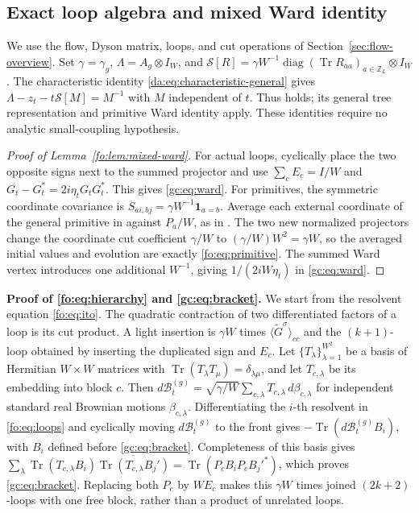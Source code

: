 \documentclass[11pt]{article}
\numberwithin{equation}{section}
\theoremstyle{remark}
\newcommand{\Z}{\mathbb Z}
\newcommand{\Tr}{\operatorname{Tr}}
\newcommand{\wt}{\widetilde}
\newcommand{\diag}{\operatorname{diag}}
\begin{document}
\subsection{Exact loop algebra and mixed Ward identity}\label{sec:gc-objects}
We use the flow, Dyson matrix, loops, and cut operations of
Section~\ref{sec:flow-overview}. Set $\gamma=\gamma_g$,
$\Lambda=A_g\otimes I_W$, and
$\mathcal S[R]=\gamma W^{-1}\diag(\Tr R_{aa})_{a\in\Z_L}\otimes I_W$.
The characteristic identity \eqref{da:eq:characteristic-general} gives
$\Lambda-z_t-t\mathcal S[M]=M^{-1}$ with $M$ independent of $t$.
Thus \cite[Assumption~4.1]{TYY} holds; its general tree representation
\cite[Lemma~4.16, (4.15)--(4.16)]{TYY} and primitive Ward identity
\cite[Corollary~4.21]{TYY} apply. These identities require no analytic
small-coupling hypothesis.

\begin{proof}[Proof of Lemma~\ref{fo:lem:mixed-ward}]
For actual loops, cyclically place the two opposite signs next to the
summed projector and use $\sum_cE_c=I/W$ and
$G_t-G_t^*=2i\eta_tG_tG_t^*$. This gives \eqref{gc:eq:ward}.
For primitives, the symmetric coordinate covariance is
$S_{ai,bj}=\gamma W^{-1}\mathbf1_{a=b}$.
Average each external coordinate of the general primitive in
\cite[Corollary~4.21]{TYY} against $P_a/W$, as in
\cite[Lemma~4.26, (4.38)]{TYY}.
The two new normalized projectors change the coordinate cut coefficient
$\gamma/W$ to $(\gamma/W)W^2=\gamma W$, so the averaged initial
values and evolution are exactly \eqref{fo:eq:primitive}.
The summed Ward vertex introduces one additional $W^{-1}$, giving
$1/(2iW\eta_t)$ in \eqref{gc:eq:ward}.
\end{proof}

\noindent\textbf{Proof of \eqref{fo:eq:hierarchy} and \eqref{gc:eq:bracket}.}
We start from the resolvent equation \eqref{fo:eq:ito}. The quadratic
contraction of two differentiated factors of a loop is its cut product.
A light insertion is $\gamma W$ times
$\langle\wt G^{\sigma}\rangle_{cc}$ and the $(k+1)$-loop obtained by
inserting the duplicated sign and $E_c$.
Let $\{T_\lambda\}_{\lambda=1}^{W^2}$ be a basis of Hermitian
$W\times W$ matrices with $\Tr(T_\lambda T_\mu)=\delta_{\lambda\mu}$,
and let $T_{c,\lambda}$ be its embedding into block $c$.
Then $d\mathcal B_t^{(g)}=\sqrt{\gamma/W}\sum_{c,\lambda}
T_{c,\lambda}\,d\beta_{c,\lambda}$ for independent standard real
Brownian motions $\beta_{c,\lambda}$.
Differentiating the $i$-th resolvent in \eqref{fo:eq:loops} and
cyclically moving $d\mathcal B_t^{(g)}$ to the front gives
$-\Tr(d\mathcal B_t^{(g)}B_i)$, with $B_i$ defined before
\eqref{gc:eq:bracket}.
Completeness of this basis gives
$\sum_\lambda\Tr(T_{c,\lambda}B_i)
\overline{\Tr(T_{c,\lambda}B_j')}
=\Tr(P_cB_iP_cB_j'^*)$, which proves \eqref{gc:eq:bracket}.
Replacing both $P_c$ by $WE_c$ makes this $\gamma W$ times
joined $(2k+2)$-loops with one free block, rather than a product
of unrelated loops.
\end{document}
